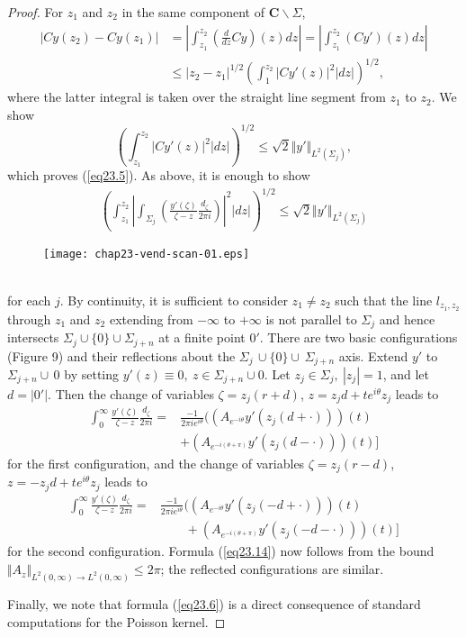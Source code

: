 \documentclass{surv-l}
\theoremstyle{plain}
\theoremstyle{definition}
\numberwithin{equation}{chapter}
\begin{document}
\begin{proof}
For $z_{1}$ and $z_{2}$ in the same component of $\textbf{C}\backslash \Sigma$,
\begin{align*}
|Cy(z_{2})-Cy(z_{1})| & = \left|\int_{z_{1}}^{z_{2}}\left(\frac{d}{dz}Cy\right) (z)dz\right|=\left|\int_{z_{1}}^{z_{2}}(Cy')(z)dz\right| \\
& \leq |z_{2}-z_{1}|^{1/2}\left(\int_{1}^{z_{2}}|Cy'(z)|^{2}|dz|\right)^{1/2},
\end{align*}
where the latter integral is taken over the straight line segment from $z_{1}$ to $z_{2}$. We show
\begin{equation*}
\left(\int_{z_{1}}^{z_{2}}|Cy'(z)|^{2}|dz|\right)^{1/2}\leq \sqrt{2}\Vert y' \Vert_{L^{2}(\Sigma_{j})},
\end{equation*}
which proves (\ref{eq23.5}). As above, it is enough to show
\renewcommand\theequation{23.14}
\setcounter{equation}{13}
\begin{align}\label{eq23.14}
\left(\int_{z_{1}}^{z_{2}}\left|\int_{\Sigma_{j}}\left(\frac{y'(\zeta)}{\zeta-z}\frac{d_{\zeta}}{2\pi i}\right)\right|^{2}|dz|\right)^{1/2}\leq \sqrt{2}\Vert y' \Vert_{L^{2}(\Sigma_{j})}
\end{align}
\begin{figure}
\texttt{[image: chap23-vend-scan-01.eps]}
\caption{}\label{fig9}
\end{figure}\\
for each $j$. By continuity, it is sufficient to consider $z_{1}\neq z_{2}$ such that the line $l_{z_{1},z_{2}}$ through $z_{1}$ and $z_{2}$ extending from $-\infty$ to $+\infty$ is not parallel to $\Sigma_{j}$ and hence intersects $\Sigma_{j}\cup\{0\}\cup\Sigma_{j+n}$ at a finite point $0'$. There are two basic configurations (Figure 9) and their reflections about the $\Sigma_{j}\,\cup\{0\}\cup\,\Sigma_{j+n}$ axis. Extend $y'$ to $\Sigma_{j+n}\cup\, 0$ by setting $y'(z)\equiv 0,\ z\in\Sigma_{j+n}\cup 0$. Let $z_{j}\in\Sigma_{j},\ |z_{j}|=1$, and let $d=|0'|$. Then the change of variables $\zeta=z_{j}(r+d)$, $ z=z_{j}d+te^{i\theta}z_{j}$ leads to
\begin{align*}
\int_{0}^{\infty}\frac{y'(\zeta)}{\zeta-z}\frac{d_{\zeta}}{2\pi i}= & \frac{-1}{2\pi ie^{i\theta}}((A_{e^{-i\theta}}y'(z_{j}(d+\cdot)))(t)\\
& +(A_{e^{-i(\theta+\pi)}}y'(z_{j}(d-\cdot)))(t)]
\end{align*}
for the first configuration, and the change of variables $\zeta=z_{j}(r-d)$, $z=-z_{j}d+ te^{i\theta}z_{j}$ leads to
\begin{align*}
\int_{0}^{\infty}\frac{y'(\zeta)}{\zeta-z}\frac{d_{\zeta}}{2\pi i}= & \frac{-1}{2\pi ie^{i\theta}}((A_{e^{-i\theta}}y'(z_{j}(-d+\cdot)))(t)\\
&\qquad +(A_{e^{-i(\theta+\pi)}}y'(z_{j}(-d-\cdot)))(t)]
\end{align*}
for the second configuration. Formula (\ref{eq23.14}) now follows from the bound $\Vert A_{z}\Vert_{{L^{2}}(0,\infty)\rightarrow L^{2}(0,\infty)}\leq 2\pi$; the reflected configurations are similar.

Finally, we note that formula (\ref{eq23.6}) is a direct consequence of standard computations for the Poisson kernel.
\end{proof}
\end{document}
